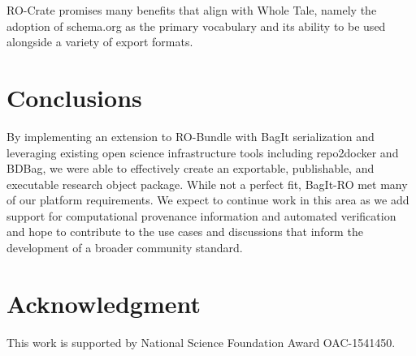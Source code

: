 \documentclass[conference]{IEEEtran}
\begin{document}
RO-Crate promises many benefits that align with Whole Tale, namely the adoption of schema.org as the primary vocabulary and its ability to be used alongside a variety of export formats. 


\section{Conclusions} \label{conclusion}
By implementing an extension to RO-Bundle with BagIt serialization and leveraging existing open science infrastructure tools including repo2docker and BDBag, we were able to effectively create an exportable, publishable, and executable research object package.  While not a perfect fit, BagIt-RO met many of our platform requirements. We expect to continue work in this area as we add support for computational provenance information and automated verification and hope to contribute to the use cases and discussions that inform the development of a broader community standard.

\section*{Acknowledgment}

This work is supported by National Science Foundation Award OAC-1541450. 




\end{document}
